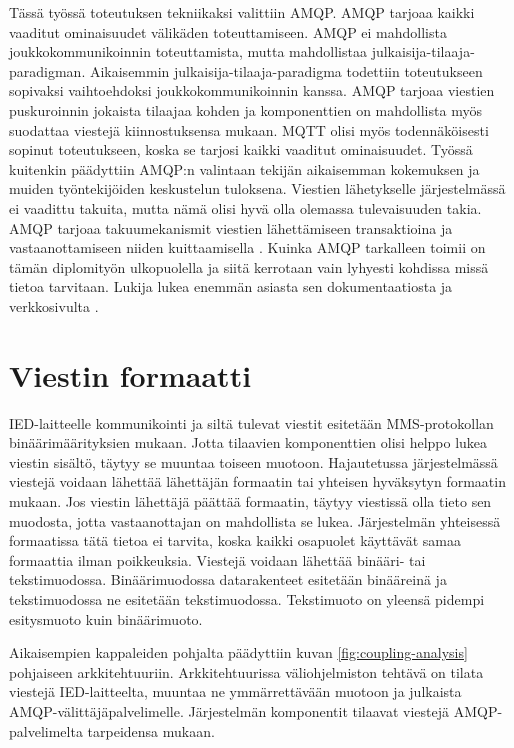 Tässä työssä toteutuksen tekniikaksi valittiin AMQP. AMQP tarjoaa kaikki vaaditut ominaisuudet välikäden toteuttamiseen. AMQP ei mahdollista joukkokommunikoinnin toteuttamista, mutta mahdollistaa julkaisija-tilaaja-paradigman. Aikaisemmin julkaisija-ti\-laa\-ja-paradigma todettiin toteutukseen sopivaksi vaihtoehdoksi joukkokommunikoinnin kanssa. AMQP tarjoaa viestien puskuroinnin jokaista tilaajaa kohden ja komponenttien on mahdollista myös suodattaa viestejä kiinnostuksensa mukaan. MQTT olisi myös todennäköisesti sopinut toteutukseen, koska se tarjosi kaikki vaaditut ominaisuudet. Työssä kuitenkin päädyttiin AMQP:n valintaan tekijän aikaisemman kokemuksen ja muiden työntekijöiden keskustelun tuloksena. Viestien lähetykselle järjestelmässä ei vaadittu takuita, mutta nämä olisi hyvä olla olemassa tulevaisuuden takia. AMQP tarjoaa takuumekanismit viestien lähettämiseen transaktioina ja vastaanottamiseen niiden kuittaamisella \cite[s.~14,21]{AMQP-specification}. Kuinka AMQP tarkalleen toimii on tämän diplomityön ulkopuolella ja siitä kerrotaan vain lyhyesti kohdissa missä tietoa tarvitaan. Lukija lukea enemmän asiasta sen dokumentaatiosta \cite{AMQP-specification} ja verkkosivulta \cite{amqp-homepage}.


\section{Viestin formaatti}
IED-laitteelle kommunikointi ja siltä tulevat viestit esitetään MMS-protokollan binäärimäärityksien mukaan. Jotta tilaavien komponenttien olisi helppo lukea viestin sisältö, täytyy se muuntaa toiseen muotoon. Hajautetussa järjestelmässä viestejä voidaan lähettää lähettäjän formaatin tai yhteisen hyväksytyn formaatin mukaan. Jos viestin lähettäjä päättää formaatin, täytyy viestissä olla tieto sen muodosta, jotta vastaanottajan on mahdollista se lukea. Järjestelmän yhteisessä formaatissa tätä tietoa ei tarvita, koska kaikki osapuolet käyttävät samaa formaattia ilman poikkeuksia. Viestejä voidaan lähettää binääri- tai tekstimuodossa. Binäärimuodossa datarakenteet esitetään binääreinä ja tekstimuodossa ne esitetään tekstimuodossa. Tekstimuoto on yleensä pidempi esitysmuoto kuin binäärimuoto.

Aikaisempien kappaleiden pohjalta päädyttiin kuvan \ref{fig:coupling-analysis} pohjaiseen arkkitehtuuriin. Arkkitehtuurissa väliohjelmiston tehtävä on tilata viestejä IED-laitteelta, muuntaa ne ymmärrettävään muotoon ja julkaista AMQP-välittäjäpalvelimelle. Järjestelmän komponentit tilaavat viestejä AMQP-palvelimelta tarpeidensa mukaan.

